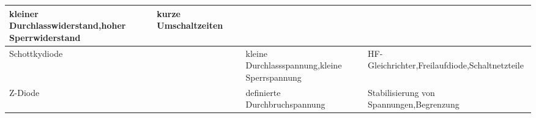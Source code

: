 {\begin{table}[H]
\begin{tabular}{ |p{2.2cm}|p{1.4cm}|p{3.3cm}|p{2.8cm}|p{3.3cm}| }
            kleiner Durchlasswiderstand,\newline hoher Sperrwiderstand &
            kurze \newline Umschaltzeiten                                                                                                                   \\
            \hline
            Schottky\-diode
                                                                       &
            \begin{minipage}[t][2.4cm][c]{1.4cm}
                \centering 
            \end{minipage}
                                                                       &
            \begin{minipage}[t][2.4cm][c]{3.3cm}
                \centering 
            \end{minipage}
                                                                       &
            kleine Durchlassspannung,\newline kleine Sperrspannung     &
            HF-Gleichrichter,\newline Freilaufdiode,\newline Schaltnetzteile                                                                                \\
            \hline
            Z-Diode
                                                                       &
            \begin{minipage}[t][2.4cm][c]{1.4cm}
                \centering 
            \end{minipage}
                                                                       &
            \begin{minipage}[t][2.4cm][c]{3.3cm}
                \centering 
            \end{minipage}
                                                                       &
            definierte Durchbruchspannung                              &
            Stabilisierung \newline von Spannungen,\newline Begrenzung                                                                                      \\

\end{tabular}
\end{table}}
